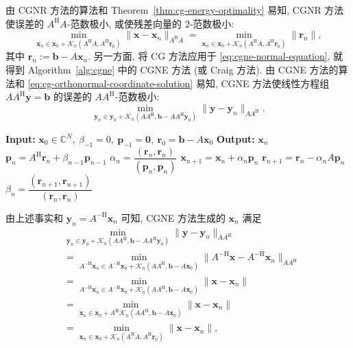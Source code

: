 {由 CGNR 方法的算法和 Theorem\ \ref{thm:cg-energy-optimality} 易知, CGNR 方法使误差的 $A^{\mathrm H}A$-范数极小, 或使残差向量的 2-范数极小:}
\[\min_{\bm x_n\in\bm x_0+\mathcal K_n(A^{\mathrm H}A,A^{\mathrm H}\bm r_0)}\|\bm x-\bm x_n\|_{A^{\mathrm H}A}=\min_{\bm x_n\in\bm x_0+\mathcal K_n(A^{\mathrm H}A,A^{\mathrm H}\bm r_0)}\|\bm r_n\|,\]
{其中 $\bm r_n:=\bm b-A\bm x_n$.}
{\leavevmode{}\label{idx:chapter-03-section-04:cgne-introduction}另一方面, 将 CG 方法应用于 \eqref{eq:cgne-normal-equation}, 就得到 Algorithm\ \ref{alg:cgne} 中的 CGNE 方法  (或 Craig 方法). 由 CGNE 方法的算法和 \eqref{eq:cg-orthonormal-coordinate-solution} 易知, CGNE 方法使线性方程组 $AA^{\mathrm H}\bm y=\bm b$ 的误差的 $AA^{\mathrm H}$-范数极小:}
\[\min_{\bm y_n\in\bm y_0+\mathcal K_n(AA^{\mathrm H},\bm b-AA^{\mathrm H}\bm y_0)}\|\bm y-\bm y_n\|_{AA^{\mathrm H}}.\]
\begin{algorithm}[H]\caption{{CGNE 方法}}\label{alg:cgne}\begin{algorithmic}[1]
\Statex\textbf{Input:} $\bm x_0\in\mathbb C^N,\ \beta_{-1}=0,\ \bm p_{-1}=\bm0,\ \bm r_0=\bm b-A\bm x_0$
\Statex\textbf{Output:} $\bm x_n$
\State $\bm p_n=A^{\mathrm H}\bm r_n+\beta_{n-1}\bm p_{n-1}$
\State $\alpha_n=\dfrac{(\bm r_n,\bm r_n)}{(\bm p_n,\bm p_n)}$
\State $\bm x_{n+1}=\bm x_n+\alpha_n\bm p_n$
\State $\bm r_{n+1}=\bm r_n-\alpha_nA\bm p_n$
\State $\beta_n=\dfrac{(\bm r_{n+1},\bm r_{n+1})}{(\bm r_n,\bm r_n)}$
\EndFor\end{algorithmic}\end{algorithm}
{由上述事实和 $\bm y_n=A^{-\mathrm H}\bm x_n$ 可知, CGNE 方法生成的 $\bm x_n$ 满足}
\[\begin{aligned}
&\min_{\bm y_n\in\bm y_0+\mathcal K_n(AA^{\mathrm H},\bm b-AA^{\mathrm H}\bm y_0)}\|\bm y-\bm y_n\|_{AA^{\mathrm H}}\\
&=\min_{A^{-\mathrm H}\bm x_n\in A^{-\mathrm H}\bm x_0+\mathcal K_n(AA^{\mathrm H},\bm b-A\bm x_0)}\|A^{-\mathrm H}\bm x-A^{-\mathrm H}\bm x_n\|_{AA^{\mathrm H}}\\
&=\min_{A^{-\mathrm H}\bm x_n\in A^{-\mathrm H}\bm x_0+\mathcal K_n(AA^{\mathrm H},\bm b-A\bm x_0)}\|\bm x-\bm x_n\|\\
&=\min_{\bm x_n\in\bm x_0+A^{\mathrm H}\mathcal K_n(AA^{\mathrm H},\bm b-A\bm x_0)}\|\bm x-\bm x_n\|\\
&=\min_{\bm x_n\in\bm x_0+\mathcal K_n(A^{\mathrm H}A,A^{\mathrm H}\bm r_0)}\|\bm x-\bm x_n\|,
\end{aligned}\]
